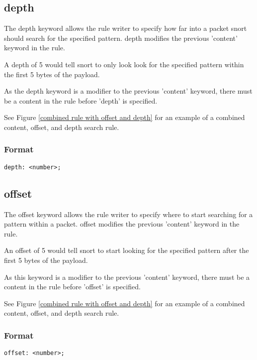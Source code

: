 \documentclass[english]{report}
\begin{document}
\subsection{depth\label{sub:depth}}

The depth keyword allows the rule writer to specify how far into a packet snort
should search for the specified pattern.  depth modifies the previous 'content'
keyword in the rule.

A depth of 5 would tell snort to only look look for the specified pattern
within the first 5 bytes of the payload.

As the depth keyword is a modifier to the previous 'content' keyword, there
must be a content in the rule before 'depth' is specified.

See Figure \ref{combined rule with offset and depth} for an example of a
combined content, offset, and depth search rule.

\subsubsection{Format}

\begin{verbatim}
depth: <number>;
\end{verbatim}

\subsection{offset}

The offset keyword allows the rule writer to specify where to start searching
for a pattern within a packet.  offset modifies the previous 'content' keyword
in the rule.

An offset of 5 would tell snort to start looking for the specified pattern
after the first 5 bytes of the payload.

As this keyword is a modifier to the previous 'content' keyword, there must be
a content in the rule before 'offset' is specified.

See Figure \ref{combined rule with offset and depth} for an example of a
combined content, offset, and depth search rule.

\subsubsection{Format}

\begin{verbatim}
offset: <number>;
\end{verbatim}
\end{document}
